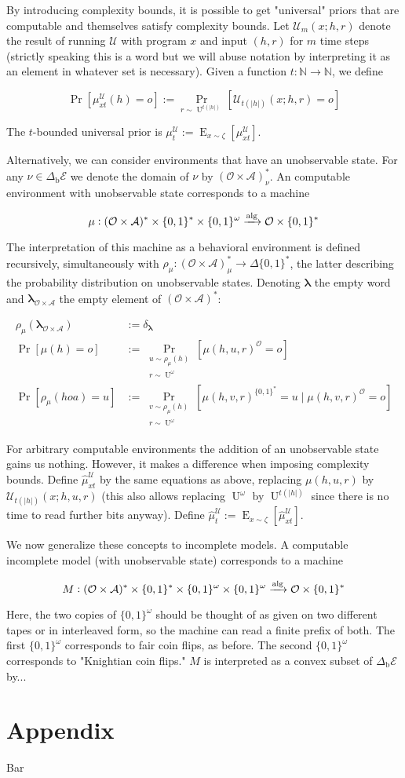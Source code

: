 \documentclass[a4paper]{article}
\newcommand{\Bool}{\{0,1\}}
\newcommand{\Words}{{\Bool^*}}
\newcommand{\Sagas}{{\Bool^\omega}}
\newcommand{\Estr}{{\bm{\lambda}}}
\DeclareMathOperator{\Prb}{Pr}
\newcommand{\PP}[2]{\operatorname{Pr}_{\substack{#1 \\ #2}}}
\DeclareMathOperator{\E}{E}
\DeclareMathOperator{\Un}{U}
\newcommand{\Nats}{\mathbb{N}}
\newcommand{\Abs}[1]{\lvert #1 \rvert}
\newcommand{\Alg}{\xrightarrow{\textnormal{alg}}}
\newcommand{\UTM}{\mathcal{U}}
\newcommand{\SP}[1]{\Delta #1}
\newcommand{\Act}{\mathcal{A}}
\newcommand{\Per}{\mathcal{O}}
\newcommand{\His}{(\Per \times \Act)^*}
\newcommand{\Env}{\mathcal{E}}
\newcommand{\Beh}{\Delta_{\operatorname{b}}}
\newcommand{\EnvB}{\Beh\Env}
\begin{document}
By introducing complexity bounds, it is possible to get "universal" priors that are computable and themselves satisfy complexity bounds. Let ${\UTM_m(x;h,r)}$ denote the result of running ${\UTM}$ with program ${x}$ and input ${(h,r)}$ for ${m}$ time steps (strictly speaking this is a word but we will abuse notation by interpreting it as an element in whatever set is necessary). Given a function ${t: \Nats \rightarrow \Nats}$, we define

$${\Prb[\mu_{xt}^\UTM(h)=o]:=\Prb_{r \sim \Un^{t(\Abs{h})}}[\UTM_{t(\Abs{h})}(x;h,r)=o]}$$

The $t$-bounded universal prior is ${\mu_t^\UTM:=\E_{x \sim \zeta}[\mu_{xt}^\UTM]}$.

Alternatively, we can consider environments that have an unobservable state. For any ${\nu \in \EnvB}$ we denote the domain of ${\nu}$ by ${\His_\nu}$. An computable environment with unobservable state corresponds to a machine

$${\mu: \His \times \Words \times \Sagas \Alg \Per \times \Words}$$ 

The interpretation of this machine as a behavioral environment is defined recursively, simultaneously with ${\rho_\mu: \His_\mu \rightarrow \SP{\Words}}$, the latter describing the probability distribution on unobservable states. Denoting ${\Estr}$ the empty word and ${\Estr_{\Per \times \Act}}$ the empty element of ${\His}$:

\begin{align*}
\rho_\mu(\Estr_{\Per \times \Act}) &:= \delta_\Estr \\
\Prb[\mu(h)=o] &:= \PP{u \sim \rho_\mu(h)}{r \sim \Un^\omega}[\mu(h,u,r)^\Per=o] \\
\Prb[\rho_\mu(hoa)=u] &:= \PP{v \sim \rho_\mu(h)}{r \sim \Un^\omega}[\mu(h,v,r)^\Words=u \mid \mu(h,v,r)^\Per=o]
\end{align*}

For arbitrary computable environments the addition of an unobservable state gains us nothing. However, it makes a difference when imposing complexity bounds. Define ${\hat{\mu}_{xt}^\UTM}$ by the same equations as above, replacing ${\mu(h,u,r)}$ by ${\UTM_{t(\Abs{h})}(x;h,u,r)}$ (this also allows replacing ${\Un^\omega}$ by ${\Un^{t(\Abs{h})}}$ since there is no time to read further bits anyway). Define ${\hat{\mu}_t^\UTM:=\E_{x \sim \zeta}[\hat{\mu}_{xt}^\UTM]}$.

We now generalize these concepts to incomplete models. A computable incomplete model (with unobservable state) corresponds to a machine 

$${M: \His \times \Words \times \Sagas \times \Sagas \Alg \Per \times \Words}$$

Here, the two copies of ${\Sagas}$ should be thought of as given on two different tapes or in interleaved form, so the machine can read a finite prefix of both. The first ${\Sagas}$ corresponds to fair coin flips, as before. The second ${\Sagas}$ corresponds to "Knightian coin flips." ${M}$ is interpreted as a convex subset of ${\EnvB}$ by...

\section{Appendix}

Bar
\end{document}
